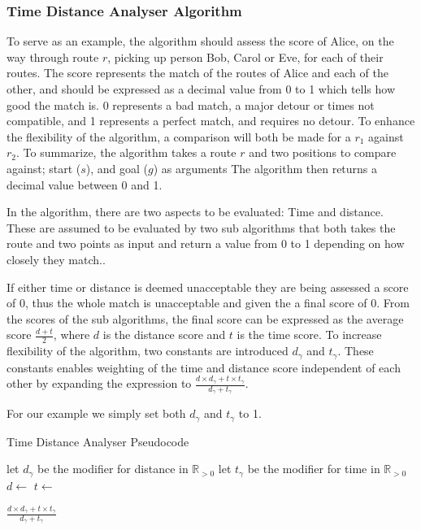 \subsubsection{Time Distance Analyser Algorithm}
To serve as an example, the algorithm should assess the score of Alice, on the way through route $r$, picking up person Bob, Carol or Eve, for each of their routes.
The score represents the match of the routes of Alice and each of the other, and should be expressed as a decimal value from 0 to 1 which tells how good the match is.
0 represents a bad match, a major detour or times not compatible, and 1 represents a perfect match, and requires no detour.
To enhance the flexibility of the algorithm, a comparison will both be made for a $r_1$ against $r_2$.
To summarize, the algorithm takes a route $r$ and two positions to compare against; start ($s$), and goal ($g$) as arguments
The algorithm then returns a decimal value between 0 and 1.

In the algorithm, there are two aspects to be evaluated: Time and distance.
These are assumed to be evaluated by two sub algorithms that both takes the route and two points as input and return a value from 0 to 1 depending on how closely they match..

If either time or distance is deemed unacceptable they are being assessed a score of 0, thus the whole match is unacceptable and given the a final score of 0.
From the scores of the sub algorithms, the final score can be expressed as the average score $\frac{d+t}{2}$, where $d$ is the distance score and $t$ is the time score.
To increase flexibility of the algorithm, two constants are introduced $d_\gamma$ and $t_\gamma$.
These constants enables weighting of the time and distance score independent of each other by expanding the expression to $\frac{d\times d_\gamma+t\times t_\gamma}{d_\gamma+t_\gamma}$.

For our example we simply set both $d_\gamma$ and $t_\gamma$ to 1. 

\begin{algorithm}
	\caption{Time Distance Analyser Pseudocode}
	\label{alg:timedistanalyser}
	\begin{algorithmic}[1]
		\Require 
		\Statex let $d_\gamma$ be the modifier for distance in $\mathbb{R}_{>0}$
		\Statex let $t_\gamma$ be the modifier for time in $\mathbb{R}_{>0}$
		\Statex 
			\State $d\gets$
			\State $t\gets$
			
				\State \Return $\frac{d\times d_\gamma+t\times t_\gamma}{d_\gamma+t_\gamma}$
			\Else
				\State{}
			\EndIf
		\EndFunction
	\end{algorithmic}
\end{algorithm}

